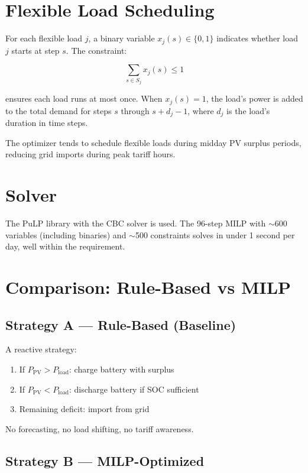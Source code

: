 \section{Flexible Load Scheduling}

For each flexible load $j$, a binary variable $x_j(s) \in \{0, 1\}$ indicates whether load $j$ starts at step $s$. The constraint:

\begin{equation}
    \sum_{s \in S_j} x_j(s) \leq 1
\end{equation}

ensures each load runs at most once. When $x_j(s) = 1$, the load's power is added to the total demand for steps $s$ through $s + d_j - 1$, where $d_j$ is the load's duration in time steps.

The optimizer tends to schedule flexible loads during midday PV surplus periods, reducing grid imports during peak tariff hours.

\section{Solver}

The PuLP library with the CBC solver is used. The 96-step MILP with $\sim$600 variables (including binaries) and $\sim$500 constraints solves in under 1 second per day, well within the requirement.

\section{Comparison: Rule-Based vs MILP}

\subsection{Strategy A --- Rule-Based (Baseline)}

A reactive strategy:
\begin{enumerate}[nosep]
    \item If $P_{\text{PV}} > P_{\text{load}}$: charge battery with surplus
    \item If $P_{\text{PV}} < P_{\text{load}}$: discharge battery if SOC sufficient
    \item Remaining deficit: import from grid
\end{enumerate}

No forecasting, no load shifting, no tariff awareness.

\subsection{Strategy B --- MILP-Optimized}

